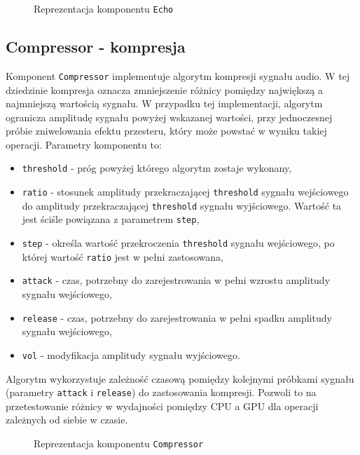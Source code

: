 \begin{figure}[H]
    \centering
    
    \caption{Reprezentacja komponentu \texttt{Echo}}
    \label{fig:Reprezentacja komponentu Echo}
\end{figure}

\subsection{Compressor - kompresja}
Komponent \texttt{Compressor} implementuje algorytm kompresji sygnału audio. W tej dziedzinie kompresja oznacza zmniejszenie różnicy pomiędzy największą a najmniejszą wartością sygnału. W przypadku tej implementacji, algorytm ogranicza amplitudę sygnału powyżej wskazanej wartości, przy jednoczesnej próbie zniwelowania efektu przesteru, który może powstać w wyniku takiej operacji. Parametry komponentu to:
\begin{itemize}
    \item \texttt{threshold} - próg powyżej którego algorytm zostaje wykonany,
    \item \texttt{ratio} - stosunek amplitudy przekraczającej \texttt{threshold} sygnału wejściowego do amplitudy przekraczającej \texttt{threshold} sygnału wyjściowego. Wartość ta jest ściśle powiązana z parametrem \texttt{step},
    \item \texttt{step} - określa wartość przekroczenia \texttt{threshold} sygnału wejściowego, po której wartość \texttt{ratio} jest w pełni zastosowana,
    \item \texttt{attack} - czas, potrzebny do zarejestrowania w pełni wzrostu amplitudy sygnału wejściowego,
    \item \texttt{release} - czas, potrzebny do zarejestrowania w pełni spadku amplitudy sygnału wejściowego,
    \item \texttt{vol} - modyfikacja amplitudy sygnału wyjściowego.
\end{itemize}
Algorytm wykorzystuje zależność czasową pomiędzy kolejnymi próbkami sygnału (parametry \texttt{attack} i \texttt{release}) do zastosowania kompresji. Pozwoli to na przetestowanie różnicy w wydajności pomiędzy CPU a GPU dla operacji zależnych od siebie w czasie.

\begin{figure}[H]
    \centering
    
    \caption{Reprezentacja komponentu \texttt{Compressor}}
    \label{fig:Reprezentacja komponentu Compressor}
\end{figure}

